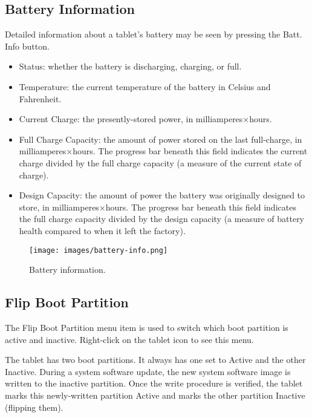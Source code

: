 \vfill

\newpage

\subsection{Battery Information}
Detailed information about a tablet's battery may be seen by pressing the Batt. Info button.

\begin{itemize}
\item{Status: whether the battery is discharging, charging, or full.}
\item{Temperature: the current temperature of the battery in Celsius and Fahrenheit.}
\item{Current Charge: the presently-stored power, in milliamperes$\times$hours.}
\item{Full Charge Capacity: the amount of power stored on the last full-charge, in milliamperes$\times$hours. The progress bar beneath this field indicates the current charge divided by the full charge capacity (a measure of the current state of charge).}
\item{Design Capacity: the amount of power the battery was originally designed to store, in milliamperes$\times$hours. The progress bar beneath this field indicates the full charge capacity divided by the design capacity (a measure of battery health compared to when it left the factory).}
\end{itemize}

\begin{figure}[h]
  \centering
  \texttt{[image: images/battery-info.png]}
  \caption{Battery information.}
  \label{fig:batteryinfo}
\end{figure}


\subsection{Flip Boot Partition}
The Flip Boot Partition menu item is used to switch which boot partition is active and inactive. Right-click on the tablet icon to see this menu.

The tablet has two boot partitions. It always has one set to Active and the other Inactive. During a system software update, the new system software image is written to the inactive partition. Once the write procedure is verified, the tablet marks this newly-written partition Active and marks the other partition Inactive (flipping them).

